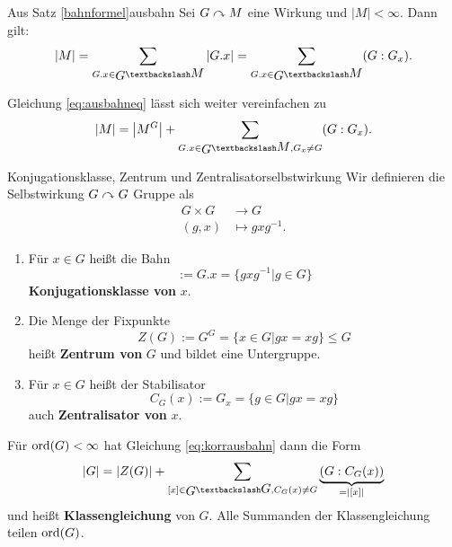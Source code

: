 \begin{korollar}{Aus Satz \ref{bahnformel}}{ausbahn}
Sei $G \curvearrowright M$ eine Wirkung und $|M| < \infty$. Dann gilt:
\begin{equation}
\label{eq:ausbahneq}
|M| = \sum_{G.x \in \invquotient{G}{M}} |G.x| = \sum_{G.x \in \invquotient{G}{M}} (G : G_x).
\end{equation}
\end{korollar}
\begin{bemerkung}
Gleichung \ref{eq:ausbahneq} lässt sich weiter vereinfachen zu
\begin{equation}
\label{eq:korrausbahn}
|M| = \left|M^G \right| + \sum_{G.x \in \invquotient{G}{M}, G_x \neq G} (G : G_x).
\end{equation}
\end{bemerkung}
\begin{definition}{Konjugationsklasse, Zentrum und Zentralisator}{selbstwirkung}
Wir definieren die Selbstwirkung $G \curvearrowright G$ Gruppe als
\begin{equation}
\begin{split}
G \times G &\to G\\
(g,x) &\mapsto gxg^{-1}.
\end{split}
\end{equation}
\begin{enumerate}
\item Für $x \in G$ heißt die Bahn
\begin{equation}
[x] := G.x = \{gxg^{-1}|g \in G\}
\end{equation}
\textbf{Konjugationsklasse von} $x$.
\item Die Menge der Fixpunkte 
\begin{equation}
Z(G) := G^G = \{x \in G | gx = xg \} \leq G
\end{equation}
heißt \textbf{Zentrum von} $G$ und bildet eine Untergruppe.
\item Für $x \in G$ heißt der Stabilisator
\begin{equation}
C_G(x):=G_x = \{g \in G|gx=xg\}
\end{equation}
auch \textbf{Zentralisator von} $x$.
\end{enumerate}
Für $\operatorname{\text{ord}} (G) < \infty$ hat Gleichung \ref{eq:korrausbahn} dann die Form
\begin{equation}
\label{eq:klassengleichung}
|G| = |Z(G)| + \sum_{[x] \in \invquotient{G}{G}, C_G(x)\neq G} \underbrace{(G : C_G(x))}_{=|[x]|}
\end{equation}
und heißt \textbf{Klassengleichung} von $G$.  Alle Summanden der Klassengleichung teilen $\operatorname{\text{ord}} (G)$.
\end{definition}
